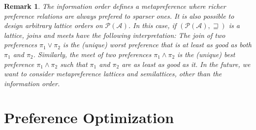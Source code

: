 \documentclass[conference]{ieeeconf}
\newcommand{\A}{\mathcal{A}}
\renewcommand{\P}{\mathcal{P}}
\newcommand{\metaprefers}{\sqsupseteq}
\newcommand{\join}{\vee}
\newcommand{\meet}{\wedge}
\newtheorem{remark}{Remark}
\begin{document}
\begin{remark}
    The information order defines a metapreference where richer preference relations are always prefered to sparser ones. It is also possible to design arbitrary lattice orders on $\P(\A)$. In this case, if $(\P(\A), \metaprefers)$ is a lattice, joins and meets have the following interpretation: The join of two preferences $\pi_1 \join \pi_2$ is the (unique) worst preference that is at least as good as both $\pi_1$ and $\pi_2$. Similarly, the meet of two preferences $\pi_1 \meet \pi_2$ is the (unique) best preference $\pi_1 \meet \pi_2$ such that $\pi_1$ and $\pi_2$ are as least as good as it. In the future, we want to consider metapreference lattices and semilattices, other than the information order.
\end{remark}





\section{Preference Optimization}



\end{document}
